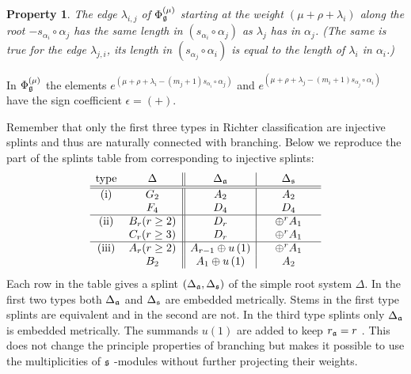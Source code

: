 \documentclass[12pt]{article}
\newtheorem{Prop}[Def]{Property}
\begin{document}
\begin{Prop}
The edge $\lambda _{i,j}$ of $\Phi _{\frak{g}}^{\left( \mu \right) }$
starting at the weight $\left( \mu +\rho +\lambda _{i}\right) $ along the
root $-s_{\alpha _{i}}\circ \alpha _{j}$ has the same length in $(s_{\alpha
_{i}}\circ \alpha _{j})$ as $\lambda _{j}$ has in $\alpha _{j}$. (The same
is true for the edge $\lambda _{j,i}$, its length in $(s_{\alpha _{j}}\circ
\alpha _{i})$ is equal to the length of $\lambda _{i}$ in $\alpha _{i}$.)
\label{diagram property}
\end{Prop}

In $\Phi _{\frak{g}}^{\left( \mu \right) }$ the elements $e^{\left( \mu
+\rho +\lambda _{i}-(m_{j}+1)s_{\alpha _{i}}\circ \alpha _{j}\right) }$ and $%
e^{\left( \mu +\rho +\lambda _{j}-(m_{i}+1)s_{\alpha _{j}}\circ \alpha
_{i}\right) }$ have the sign coefficient  $\epsilon =(+)$.

Remember that only the first three types in Richter classification are
injective splints and thus are naturally connected with branching. Below we
reproduce the part of the splints table from \cite{richter2008splints} corresponding to
injective splints:
\[
\begin{array}{cc||c|c}
\hbox{type} & \hspace{0.25in}\Delta \hspace{0.25in} & \hspace{0.25in}\Delta
_{\frak{a}}\hspace{0.25in} & \hspace{0.25in}\Delta _{\frak{s}}\hspace{0.25in}
\\ \hline\hline
\hbox{(i)} & G_{2} & A_{2} & A_{2} \\
& F_{4} & D_{4} & D_{4} \\ \hline
\hbox{(ii)} & B_{r}(r\geq 2) & D_{r} & \oplus ^{r}A_{1} \\
& C_{r}(r\geq 3) & D_{r} & \oplus ^{r}A_{1} \\ \hline
\hbox{(iii)} & A_{r}(r\geq 2) & A_{r-1}\oplus u\left( 1\right)  & \oplus
^{r}A_{1} \\
& B_{2} & A_{1}\oplus u\left( 1\right)  & A_{2}
\end{array}
\]
Each row in the table gives a splint $(\Delta _{\frak{a}},\Delta _{\frak{s}})
$ of the simple root system $\Delta $. In the first two types both $\Delta _{%
\frak{a}}$ and $\Delta _{\frak{s}}$ are embedded metrically. Stems in the
first type splints are equivalent and in the second are not. In the third
type splints only $\Delta _{\frak{a}}$ is embedded metrically. The summands $%
u\left( 1\right) $ are added to keep $r_{\frak{a}}=r$ . This does not change
the principle properties of branching but makes it possible to use the
multiplicities of $\frak{s}$ -modules without further projecting their
weights.
\end{document}
